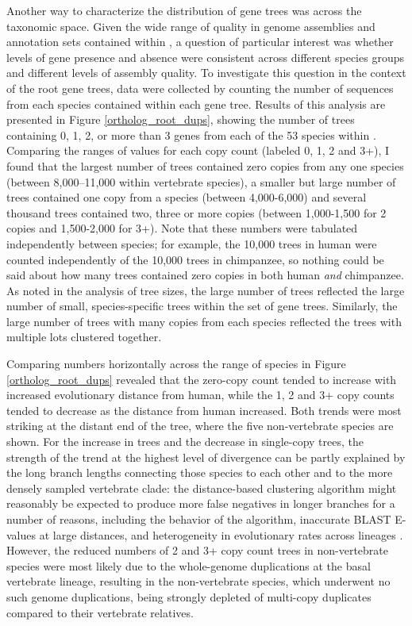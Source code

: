 Another way to characterize the distribution of \cmp gene trees was
across the taxonomic space. Given the wide range of quality in genome
assemblies and annotation sets contained within \ens, a question of
particular interest was whether levels of gene presence and absence
were consistent across different species groups and different levels
of assembly quality. To investigate this question in the context of
the root \cmp gene trees, data were collected by counting the number
of sequences from each species contained within each gene
tree. Results of this analysis are presented in Figure
\ref{ortholog_root_dups}, showing the number of trees containing 0, 1,
2, or more than 3 genes from each of the 53 species within
\ens. Comparing the ranges of values for each copy count (labeled 0,
1, 2 and 3+), I found that the largest number of trees contained zero
copies from any one species (between 8,000--11,000 within vertebrate
species), a smaller but large number of trees contained one copy from
a species (between 4,000-6,000) and several thousand trees contained
two, three or more copies (between 1,000-1,500 for 2 copies and
1,500-2,000 for 3+). Note that these numbers were tabulated
independently between species; for example, the 10,000 \zcop trees in
human were counted independently of the 10,000 \zcop trees in
chimpanzee, so nothing could be said about how many trees contained
zero copies in both human \emph{and} chimpanzee. As noted in the
analysis of tree sizes, the large number of \zcop trees reflected the
large number of small, species-specific trees within the set of \cmp
gene trees. Similarly, the large number of trees with many copies from
each species reflected the trees with multiple \mammln \acp{lot}
clustered together.

Comparing numbers horizontally across the range of species in Figure
\ref{ortholog_root_dups} revealed that the zero-copy count tended to
increase with increased evolutionary distance from human, while the 1,
2 and 3+ copy counts tended to decrease as the distance from human
increased. Both trends were most striking at the distant end of the
tree, where the five non-vertebrate species are shown. For the
increase in \zcop trees and the decrease in single-copy trees, the
strength of the trend at the highest level of divergence can be partly
explained by the long branch lengths connecting those species to each
other and to the more densely sampled vertebrate clade: the
distance-based clustering algorithm might reasonably be expected to
produce more false negatives in longer branches for a number of
reasons, including the behavior of the \hclust algorithm, inaccurate
BLAST E-values at large distances, and heterogeneity in evolutionary
rates across lineages \citep{Whelan2008}. However, the reduced numbers
of 2 and 3+ copy count trees in non-vertebrate species were most
likely due to the whole-genome duplications at the basal vertebrate
lineage, resulting in the non-vertebrate species, which underwent no
such genome duplications, being strongly depleted of multi-copy
duplicates compared to their vertebrate relatives.


